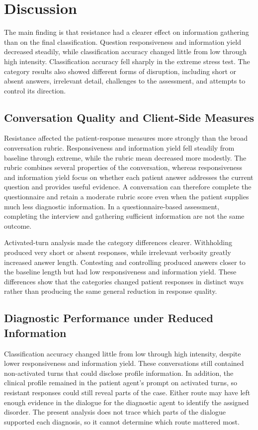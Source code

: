 \section{Discussion}\label{s:discussion}

The main finding is that resistance had a clearer effect on information gathering than on the final classification. Question responsiveness and information yield decreased steadily, while classification accuracy changed little from low through high intensity. Classification accuracy fell sharply in the extreme stress test. The category results also showed different forms of disruption, including short or absent answers, irrelevant detail, challenges to the assessment, and attempts to control its direction.

\subsection{Conversation Quality and Client-Side Measures}

Resistance affected the patient-response measures more strongly than the broad conversation rubric. Responsiveness and information yield fell steadily from baseline through extreme, while the rubric mean decreased more modestly. The rubric combines several properties of the conversation, whereas responsiveness and information yield focus on whether each patient answer addresses the current question and provides useful evidence. A conversation can therefore complete the questionnaire and retain a moderate rubric score even when the patient supplies much less diagnostic information. In a questionnaire-based assessment, completing the interview and gathering sufficient information are not the same outcome.

Activated-turn analysis made the category differences clearer. Withholding produced very short or absent responses, while irrelevant verbosity greatly increased answer length. Contesting and controlling produced answers closer to the baseline length but had low responsiveness and information yield. These differences show that the categories changed patient responses in distinct ways rather than producing the same general reduction in response quality.

\subsection{Diagnostic Performance under Reduced Information}

Classification accuracy changed little from low through high intensity, despite lower responsiveness and information yield. These conversations still contained non-activated turns that could disclose profile information. In addition, the clinical profile remained in the patient agent's prompt on activated turns, so resistant responses could still reveal parts of the case. Either route may have left enough evidence in the dialogue for the diagnostic agent to identify the assigned disorder. The present analysis does not trace which parts of the dialogue supported each diagnosis, so it cannot determine which route mattered most.

